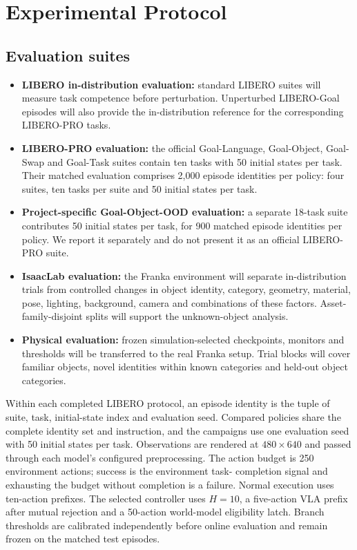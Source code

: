 \section{Experimental Protocol}
\label{sec:experiments}

\subsection{Evaluation suites}

\begin{itemize}
  \item \textbf{LIBERO in-distribution evaluation:} standard LIBERO suites will
  measure task competence before perturbation. Unperturbed LIBERO-Goal episodes
  will also provide the in-distribution reference for the corresponding
  LIBERO-PRO tasks.

  \item \textbf{LIBERO-PRO evaluation:} the official Goal-Language,
  Goal-Object, Goal-Swap and Goal-Task suites contain ten tasks with 50 initial
  states per task. Their matched evaluation comprises 2,000 episode identities
  per policy: four suites, ten tasks per suite and 50 initial states per task.

  \item \textbf{Project-specific Goal-Object-OOD evaluation:} a separate
  18-task suite contributes 50 initial states per task, for 900 matched episode
  identities per policy. We report it separately and do not present it as an
  official LIBERO-PRO suite.

  \item \textbf{IsaacLab evaluation:} the Franka environment will separate
  in-distribution trials from controlled changes in object identity, category,
  geometry, material, pose, lighting, background, camera and combinations of
  these factors. Asset-family-disjoint splits will support the unknown-object
  analysis.

  \item \textbf{Physical evaluation:} frozen simulation-selected checkpoints,
  monitors and thresholds will be transferred to the real Franka setup. Trial
  blocks will cover familiar objects, novel identities within known categories
  and held-out object categories.
\end{itemize}

Within each completed LIBERO protocol, an episode identity is the tuple of
suite, task, initial-state index and evaluation seed. Compared policies share
the complete identity set and instruction, and the campaigns use one evaluation
seed with 50 initial states per task. Observations are rendered at
\(480\!\times\!640\) and passed through each model's configured preprocessing.
The action budget is 250 environment actions; success is the environment task-
completion signal and exhausting the budget without completion is a failure.
Normal execution uses ten-action prefixes. The selected controller uses
\(H=10\), a five-action VLA prefix after mutual rejection and a 50-action
world-model eligibility latch. Branch thresholds are calibrated independently
before online evaluation and remain frozen on the matched test episodes.

